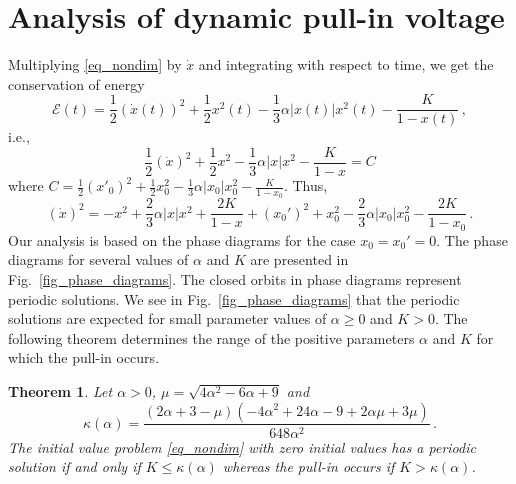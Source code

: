 \documentclass[review]{elsarticle}
\newtheorem{theorem}{Theorem}
\begin{document}
\section{Analysis of dynamic pull-in voltage}
Multiplying \eqref{eq_nondim} by $\dot{x}$ and integrating with respect to time, we get the conservation of energy
\[
{\mathcal{E}}(t)=\frac{1}{2}(\dot{x}(t))^2+\frac{1}{2}x^2(t)-\frac{1}{3}\alpha |x(t)|x^2(t)-\frac{K}{1-x(t)}\,,
\]
i.e.,
\begin{equation*}
\label{eq_energy}
\frac{1}{2}(\dot{x})^2+\frac{1}{2}x^2-\frac{1}{3}\alpha |x|x^2-\frac{K}{1-x} = C
\end{equation*}
where $C=\frac{1}{2}(x'_0)^2+\frac{1}{2}x_0^2-\frac{1}{3}\alpha |x_0|x_0^2-\frac{K}{1-x_0}$. Thus,
\begin{equation}\label{eq_dxdt^2}
(\dot{x})^2=-x^2 + \frac{2}{3}\alpha |x|x^2+\frac{2K}{1-x}+(x_0')^2+x_0^2
-\frac{2}{3}\alpha |x_0| x_0^2-\frac{2K}{1-x_0}\,.
\end{equation}
Our analysis is based on the phase diagrams for the case $x_0=x_0'=0$. The phase diagrams for several values of $\alpha$ and $K$ are presented in Fig.~\ref{fig_phase_diagrams}. The closed orbits in phase diagrams represent periodic solutions. We see in Fig.~\ref{fig_phase_diagrams} that the periodic solutions are expected for small parameter values of $\alpha\ge 0$ and $K>0$. The following theorem determines the range of the positive parameters $\alpha$ and $K$ for which
the pull-in occurs.

\begin{theorem}\label{thm1} Let $\alpha>0$, $\mu=\sqrt{4\alpha^2-6\alpha+9}$ and
\begin{equation*}
\kappa(\alpha)=\frac{(2\alpha+3-\mu)(-4\alpha^2+24\alpha-9+2\alpha\mu+3\mu)}{648\alpha^2}\,.
\end{equation*}
The initial value problem \eqref{eq_nondim} with zero initial values has a periodic solution if and only if
$K \le \kappa(\alpha)$
whereas the pull-in occurs if $K>\kappa(\alpha)$.
\end{theorem}
\end{document}
